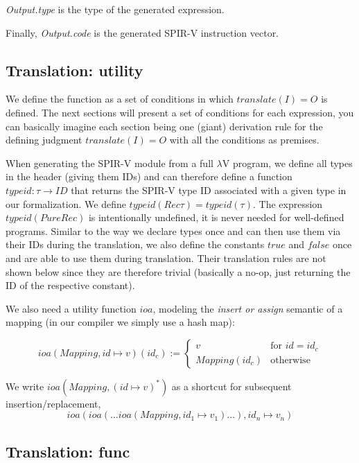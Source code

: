 \documentclass[letterpaper,12pt]{article}
\begin{document}
\textit{Output.type} is the type of the generated expression.

Finally, \textit{Output.code} is the generated SPIR-V instruction vector.

\subsection{Translation: utility}

We define the function as a set of conditions in which $translate(I) = O$
is defined. The next sections will present a set of conditions for each
expression, you can basically imagine each section being one (giant)
derivation rule for the defining judgment $translate(I) = O$
with all the conditions as premises. 

When generating the SPIR-V module from a full $\lambda$V program,
we define all types in the header (giving them IDs) and can therefore define a
function $typeid: \tau \rightarrow ID$ that returns the SPIR-V type ID
associated with a given type in our formalization. 
We define $typeid(Rec \tau) = typeid(\tau)$. The expression $typeid(PureRec)$
is intentionally undefined, it is never needed for well-defined programs.
Similar to the way we declare types once and can then use them via their
IDs during the translation, we also define the constants $true$ and $false$
once and are able to use them during translation. Their translation
rules are not shown below since they are therefore trivial (basically
a no-op, just returning the ID of the respective constant).

We also need a utility function $ioa$, modeling
the \textit{insert or assign} semantic of a mapping (in our compiler
we simply use a hash map):

\[
	ioa(Mapping, id \mapsto v)(id_c) :=
	\begin{cases}
		v & \text{for } id = id_c \\
		Mapping(id_c) & \text{otherwise}
	\end{cases}
\]

We write $ioa(Mapping, (id \mapsto v)^*)$ as a shortcut for subsequent
insertion/replacement, \\
\[
	ioa(ioa( \dots ioa(Mapping, id_1 \mapsto v_1) \dots ), id_n \mapsto v_n)
\]

\subsection{Translation: func}
\end{document}
